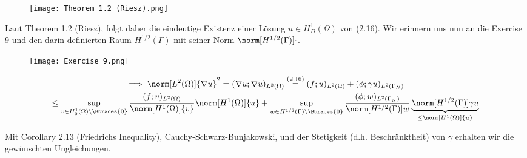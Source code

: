 \begin{solution}
\begin{enumerate}[label = (\roman*)]
    \begin{figure}[h!]
        \centering
        \texttt{[image: Theorem 1.2 (Riesz).png]}
    \end{figure}

    Laut Theorem 1.2 (Riesz), folgt daher die eindeutige Existenz einer Lösung $u \in H_D^1(\Omega)$ von (2.16).
    Wir erinnern uns nun an die Exercise 9 und den darin definierten Raum $H^{1/2}(\Gamma)$ mit seiner Norm $\norm[H^{1/2}(\Gamma)]{\cdot}$.

    \begin{figure}[h!]
        \centering
        \texttt{[image: Exercise 9.png]}
    \end{figure}

    \begin{multline*}
        \implies
        \norm[L^2(\Omega)]{\nabla u}^2
        =
        (\nabla u; \nabla u)_{L^2(\Omega)}
        \stackrel{\text{(2.16)}}{=}
        (f; u)_{L^2(\Omega)}
        +
        (\phi; \gamma u)_{L^2(\Gamma_N)} \\
        \leq
        \sup_{v \in H_0^1(\Omega) \setminus \Bbraces{0}}
        \frac
        {
            (f; v)_{L^2(\Omega)}
        }{
            \norm[H^1(\Omega)]{v}
        }
        \norm[H^1(\Omega)]{u}
        +
        \sup_{w \in H^{1/2}(\Gamma) \setminus \Bbraces{0}}
        \frac
        {
            (\phi; w)_{L^2(\Gamma_N)}
        }{
            \norm[H^{1/2}(\Gamma)]{w}
        }
        \underbrace
        {
            \norm[H^{1/2}(\Gamma)]{\gamma u}
        }_{
            \leq
            \norm[H^1(\Omega)]{u}
        }
    \end{multline*}

    Mit Corollary 2.13 (Friedrichs Inequality), Cauchy-Schwarz-Bunjakowski, und der Stetigkeit (d.h. Beschränktheit) von $\gamma$ erhalten wir die gewünschten Ungleichungen.


\end{enumerate}
\end{solution}
